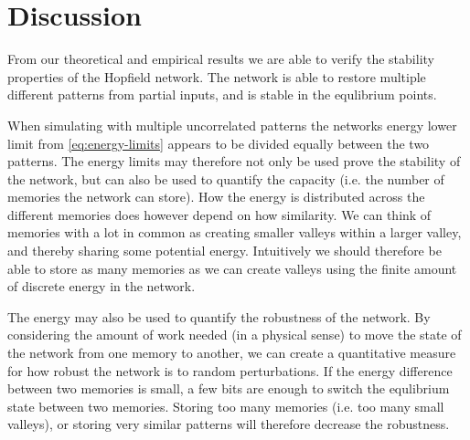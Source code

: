 \section{Discussion}

From our theoretical and empirical results we are able to verify the stability properties of the Hopfield network. The network is able to restore multiple different patterns from partial inputs, and is stable in the equlibrium points. 

When simulating with multiple uncorrelated patterns the networks energy lower limit from \cref{eq:energy-limits} appears to be divided equally between the two patterns. The energy limits may therefore not only be used prove the stability of the network, but can also be used to quantify the capacity (i.e. the number of memories the network can store). How the energy is distributed across the different memories does however depend on how similarity. We can think of memories with a lot in common as creating smaller valleys within a larger valley, and thereby sharing some potential energy. Intuitively we should therefore be able to store as many memories as we can create valleys using the finite amount of discrete energy in the network. 

The energy may also be used to quantify the robustness of the network. By considering the amount of work needed (in a physical sense) to move the state of the network from one memory to another, we can create a quantitative measure for how robust the network is to random perturbations. If the energy difference between two memories is small, a few bits are enough to switch the equlibrium state between two memories. Storing too many memories (i.e. too many small valleys), or storing very similar patterns will therefore decrease the robustness.







